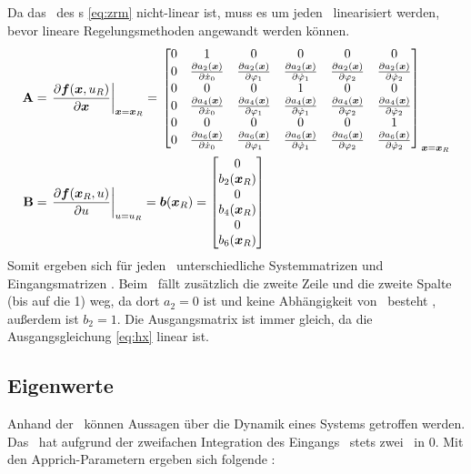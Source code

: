 Da das \zrm\ des \spds s \eqref{eq:zrm} nicht-linear ist, muss es um jeden \ap\ linearisiert werden, bevor lineare Regelungsmethoden angewandt werden können. 
\begin{align}
	{\ensuremath{\boldsymbol{\mathrm{A}}}} &= \left. \frac{\partial \boldsymbol{f}(\boldsymbol{x},u_R)}{\partial \boldsymbol{x}} \right|_{\boldsymbol{x}=\boldsymbol{x}_R}  
		= \left. \begin{bmatrix}
		0 & 1 & 0 & 0 & 0 & 0 \\
		0 & \frac{\partial a_2(\boldsymbol{x})}{\partial \dot{x}_0} & \frac{\partial a_2(\boldsymbol{x})}{\partial \varphi_1} & \frac{\partial a_2(\boldsymbol{x})}{\partial \dot{\varphi}_1} & \frac{\partial a_2(\boldsymbol{x})}{\partial \varphi_2} & \frac{\partial a_2(\boldsymbol{x})}{\partial \dot{\varphi}_2} \\
		0 & 0 & 0 & 1 & 0 & 0 \\
		0 & \frac{\partial a_4(\boldsymbol{x})}{\partial \dot{x}_0} & \frac{\partial a_4(\boldsymbol{x})}{\partial \varphi_1} & \frac{\partial a_4(\boldsymbol{x})}{\partial \dot{\varphi}_1} & \frac{\partial a_4(\boldsymbol{x})}{\partial \varphi_2} & \frac{\partial a_4(\boldsymbol{x})}{\partial \dot{\varphi}_2} \\
		0 & 0 & 0 & 0 & 0 & 1 \\
		0 & \frac{\partial a_6(\boldsymbol{x})}{\partial \dot{x}_0} & \frac{\partial a_6(\boldsymbol{x})}{\partial \varphi_1} & \frac{\partial a_6(\boldsymbol{x})}{\partial \dot{\varphi}_1} & \frac{\partial a_6(\boldsymbol{x})}{\partial \varphi_2} & \frac{\partial a_6(\boldsymbol{x})}{\partial \dot{\varphi}_2} \\
	\end{bmatrix} \right._{\boldsymbol{x}=\boldsymbol{x}_R}  \\
	{\boldsymbol{\mathrm{B}}} &= \left. \frac{\partial \boldsymbol{f}(\boldsymbol{x}_R,u)}{\partial u} \right|_{u=u_R}
	= \boldsymbol{b}(\boldsymbol{x}_R) = \begin{bmatrix}
		0 \\ b_2(\boldsymbol{x}_R) \\ 0 \\  b_4(\boldsymbol{x}_R) \\ 0 \\  b_6(\boldsymbol{x}_R)
	\end{bmatrix}
\end{align}
Somit ergeben sich für jeden \ap\ unterschiedliche Systemmatrizen  und Eingangsmatrizen . Beim \bss\ fällt zusätzlich die zweite Zeile und die zweite Spalte (bis auf die 1) weg, da dort $a_2=0$ ist und keine Abhängigkeit von \xop\ besteht , außerdem ist $b_2=1$.
Die Ausgangsmatrix  ist immer gleich, da die Ausgangsgleichung \eqref{eq:hx} linear ist.


\subsection{Eigenwerte}

Anhand der \ewe\ können Aussagen über die Dynamik eines Systems getroffen werden. 
Das \bss\ hat aufgrund der zweifachen Integration des Eingangs \xopp\ stets zwei \ewe\ in 0. 
Mit den Apprich-Parametern ergeben sich folgende \ewe:

